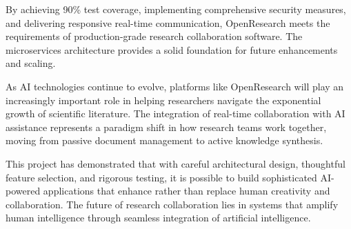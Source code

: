\documentclass[12pt]{report}
\begin{document}
By achieving 90\% test coverage, implementing comprehensive security measures, and delivering responsive real-time communication, OpenResearch meets the requirements of production-grade research collaboration software. The microservices architecture provides a solid foundation for future enhancements and scaling.

As AI technologies continue to evolve, platforms like OpenResearch will play an increasingly important role in helping researchers navigate the exponential growth of scientific literature. The integration of real-time collaboration with AI assistance represents a paradigm shift in how research teams work together, moving from passive document management to active knowledge synthesis.

This project has demonstrated that with careful architectural design, thoughtful feature selection, and rigorous testing, it is possible to build sophisticated AI-powered applications that enhance rather than replace human creativity and collaboration. The future of research collaboration lies in systems that amplify human intelligence through seamless integration of artificial intelligence.

\end{document}
